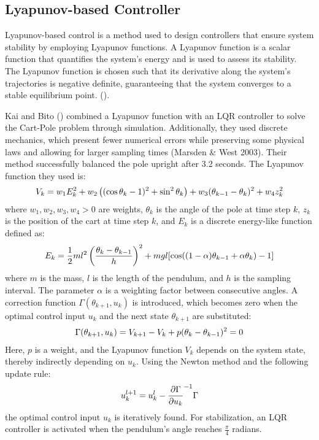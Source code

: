\subsection{Lyapunov-based Controller}

Lyapunov-based control is a method used to design controllers that ensure system stability by employing Lyapunov functions. A Lyapunov function is a scalar function that quantifies the system's energy and is used to assess its stability. The Lyapunov function is chosen such that its derivative along the system's trajectories is negative definite, guaranteeing that the system converges to a stable equilibrium point. (\cite{slotine_applied_1991}).

Kai and Bito (\citeyear{kai_new_2014}) combined a Lyapunov function with an LQR controller to solve the Cart-Pole problem through simulation. Additionally, they used discrete mechanics, which present fewer numerical errors while preserving some physical laws and allowing for larger sampling times (Marsden & West 2003). Their method successfully balanced the pole upright after 3.2 seconds. The Lyapunov function they used is:
\begin{align}
    V_k = w_1E_k^2 + w_2\left((\cos\theta_k-1)^2 + \sin^2\theta_k\right) + w_3(\theta_{k-1} - \theta_k)^2 + w_4z_k^2 \notag
\end{align}
where $w_1, w_2, w_3, w_4 > 0$ are weights, $\theta_k$ is the angle of the pole at time step $k$, $z_k$ is the position of the cart at time step $k$, and $E_k$ is a discrete energy-like function defined as:
\begin{align}
    E_k = \frac{1}{2}ml^2\left(\frac{\theta_k - \theta_{k-1}}{h}\right)^2 + mgl[\cos((1-\alpha)\theta_{k-1} + \alpha\theta_k) - 1] \notag
\end{align}
where $m$ is the mass, $l$ is the length of the pendulum, and $h$ is the sampling interval. The parameter $\alpha$ is a weighting factor between consecutive angles. A correction function $\Gamma(\theta_{k+1}, u_k)$ is introduced, which becomes zero when the optimal control input $u_k$ and the next state $\theta_{k+1}$ are substituted:
\begin{align}
    \Gamma(\theta_{k+1}, u_k) = V_{k+1} - V_k + p(\theta_k - \theta_{k-1})^2 = 0 \notag
\end{align}
Here, $p$ is a weight, and the Lyapunov function $V_k$ depends on the system state, thereby indirectly depending on $u_k$. Using the Newton method and the following update rule:
\begin{align}
    u_{k}^{l+1} = u_k^l - \frac{\partial\Gamma}{\partial u_k}^{-1}\Gamma \notag
\end{align}
the optimal control input $u_k$ is iteratively found. For stabilization, an LQR controller is activated when the pendulum's angle reaches $\frac{\pi}{4}$ radians.

